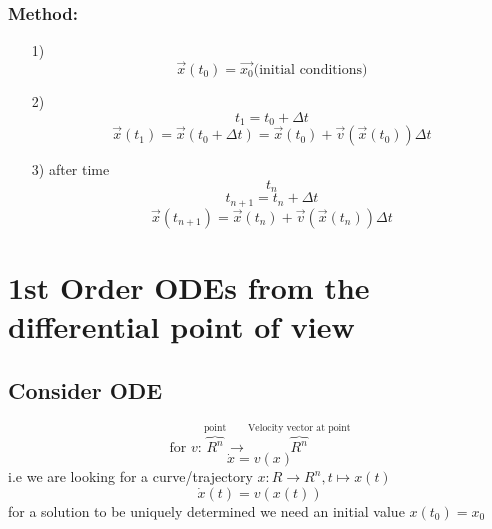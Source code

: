 \documentclass[a4paper, 12pt]{article}
\begin{document}
\subsubsection{Method:}
\begin{enumerate}
\item[1)] $$\vec{x}(t_0) = \vec{x_0} \text{(initial conditions)}$$
\item[2)] $$t_1 = t_0 + \Delta t$$ $$ \vec{x}(t_1) = \vec{x}(t_0 + \Delta t) = \vec{x}(t_0) + \vec{v}(\vec{x}(t_0)) \Delta t$$
\item[3)] after time $$t_n$$ $$t_{n+1} = t_n + \Delta t$$ $$\vec{x}(t_{n+1}) = \vec{x}(t_n) + \vec{v}(\vec{x}(t_n))\Delta t$$
\end{enumerate}

\section{1st Order ODEs from the differential point of view}
\subsection{Consider ODE}
$$ \text{for } v:\overbrace{R^n}^{\text{point}} \rightarrow \overbrace{R^n}^{\text{Velocity vector at point}}$$
$$ \dot{x} = v(x)$$
i.e we are looking for a curve/trajectory $x:R\rightarrow R^n, t \mapsto x(t)$
$$\dot{x}(t) = v(x(t))$$
for a solution to be uniquely determined we need an initial value $x(t_0) = x_0$
\end{document}
